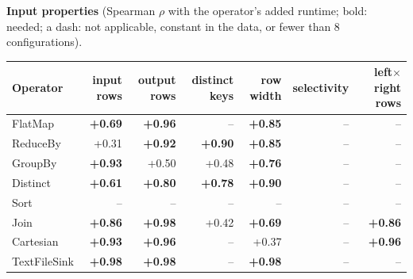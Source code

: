 \documentclass[11pt,a4paper]{article}
\newcommand{\hl}[1]{\textbf{#1}}
\begin{document}
\textbf{Input properties} (Spearman $\rho$ with the operator's added runtime; bold: needed; a dash: not applicable, constant in the data, or fewer than 8 configurations).
\begin{center}\footnotesize\begin{tabular}{lrrrrrr}\toprule

Operator & input rows & output rows & distinct keys & row width & selectivity & left$\times$right rows\\\midrule

FlatMap & \hl{+0.69} & \hl{+0.96} & -- & \hl{+0.85} & -- & --\\

ReduceBy & +0.31 & \hl{+0.92} & \hl{+0.90} & \hl{+0.85} & -- & --\\

GroupBy & \hl{+0.93} & +0.50 & +0.48 & \hl{+0.76} & -- & --\\

Distinct & \hl{+0.61} & \hl{+0.80} & \hl{+0.78} & \hl{+0.90} & -- & --\\

Sort & -- & -- & -- & -- & -- & --\\

Join & \hl{+0.86} & \hl{+0.98} & +0.42 & \hl{+0.69} & -- & \hl{+0.86}\\

Cartesian & \hl{+0.93} & \hl{+0.96} & -- & +0.37 & -- & \hl{+0.96}\\

TextFileSink & \hl{+0.98} & \hl{+0.98} & -- & \hl{+0.98} & -- & --\\
\bottomrule\end{tabular}\end{center}
\end{document}
